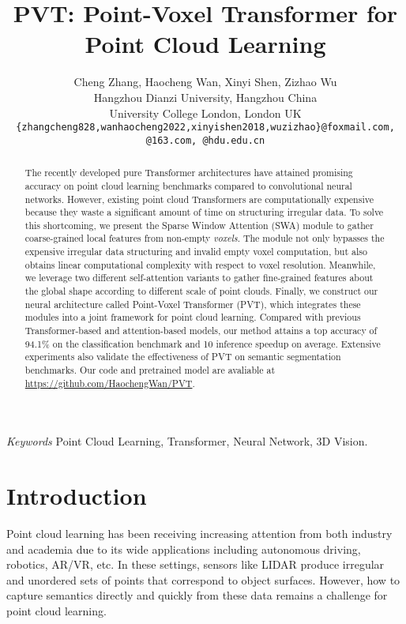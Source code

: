 \documentclass[10pt,twocolumn,letterpaper]{article}
\begin{document}
\title{PVT: Point-Voxel Transformer for Point Cloud Learning}

\author{Cheng Zhang, Haocheng Wan, Xinyi Shen, Zizhao Wu\\
Hangzhou Dianzi University, Hangzhou China\\
University College London, London UK\\
{\tt\small \{zhangcheng828,wanhaocheng2022,xinyishen2018,wuzizhao\}@foxmail.com, @163.com, @hdu.edu.cn}}


\maketitle


\begin{abstract}
The recently developed pure Transformer architectures have
attained promising accuracy on point cloud learning benchmarks compared to convolutional neural networks. However, existing point cloud Transformers are computationally expensive because they waste
a significant amount of time on structuring irregular data. To solve this shortcoming, we present the Sparse Window Attention (SWA) module to gather coarse-grained local features from non-empty \emph{voxels}. The module not only bypasses the expensive irregular data structuring and invalid empty voxel computation, but also obtains linear computational complexity with respect to voxel resolution. Meanwhile, we leverage two different self-attention variants to gather fine-grained features about the global shape according to different scale of point clouds.
Finally, we construct our neural architecture called Point-Voxel Transformer (PVT), which integrates these modules into a joint framework for point cloud learning. Compared with previous Transformer-based and attention-based models, our method attains a top accuracy of 94.1\% on the classification benchmark and 10 inference speedup on average. Extensive experiments also validate the effectiveness of PVT on semantic segmentation benchmarks. Our code and pretrained model are avaliable at \url{https://github.com/HaochengWan/PVT}.
\end{abstract}


\emph{Keywords} Point Cloud Learning, Transformer, Neural Network, 3D Vision.


\section{Introduction}
Point cloud learning has been receiving increasing attention from both industry and academia due to its wide applications including autonomous driving, robotics, AR/VR, etc. In these settings, sensors like LIDAR produce irregular and unordered sets of points that correspond to object surfaces. However, how to capture semantics directly and quickly from these data remains a challenge for point cloud learning.
\end{document}
